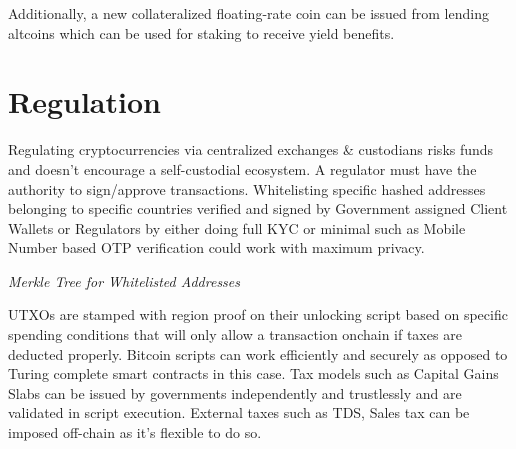 \documentclass[a4paper,10pt]{article}
\begin{document}
Additionally, a new collateralized floating-rate coin can be issued from lending altcoins which can be used for staking to receive yield benefits.

\section{Regulation}
Regulating cryptocurrencies via centralized exchanges \& custodians risks funds and doesn't encourage a self-custodial ecosystem. A regulator must have the authority to sign/approve transactions. Whitelisting specific hashed addresses belonging to specific countries verified and signed by Government assigned Client Wallets or Regulators by either doing full KYC or minimal such as Mobile Number based OTP verification could work with maximum privacy.

\textit{Merkle Tree for Whitelisted Addresses}

 UTXOs are stamped with region proof on their unlocking script based on specific spending conditions that will only allow a transaction onchain if taxes are deducted properly. Bitcoin scripts can work efficiently and securely as opposed to Turing complete smart contracts in this case. Tax models such as Capital Gains Slabs can be issued by governments independently and trustlessly and are validated in script execution. External taxes such as TDS, Sales tax can be imposed off-chain as it's flexible to do so.
\end{document}
